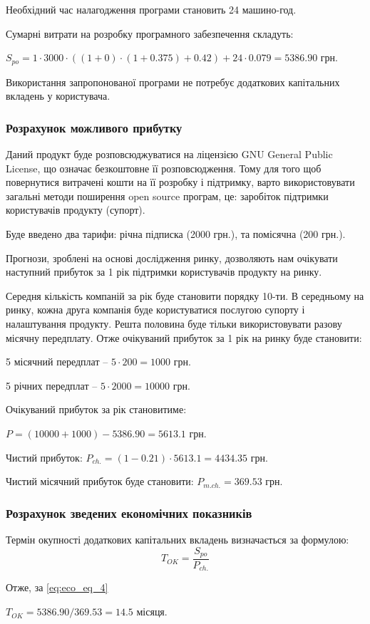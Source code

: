 \par Необхідний час налагодження програми становить 24 машино-год.
\par Сумарні витрати на розробку програмного забезпечення складуть:
	\par
\begin{center}
	$S_{po} = 1\cdot3000\cdot((1+0)\cdot(1+0.375)+0.42)+24\cdot0.079=5386.90$ грн.
\end{center}
\par Використання запропонованої програми не потребує додаткових капітальних вкладень у користувача.


\subsubsection{Розрахунок можливого прибутку}
\par Даний продукт буде розповсюджуватися на ліцензією GNU General Public License, що означає безкоштовне її розповсюдження. Тому для того щоб повернутися витрачені кошти на її розробку і підтримку, варто використовувати загальні методи поширення open source програм, це: заробіток підтримки користувачів продукту (супорт). 
\par Буде введено два тарифи: річна підписка (2000 грн.), та помісячна (200 грн.).
\par Прогнози, зроблені на основі дослідження ринку, дозволяють нам очікувати наступний прибуток за 1 рік підтримки користувачів продукту на ринку.
\par Середня кількість компаній за рік буде становити порядку 10-ти. В середньому на ринку, кожна друга компанія буде користуватися послугою супорту і налаштування продукту. Решта половина буде тільки використовувати разову місячну передплату. Отже очікуваний прибуток за 1 рік на ринку буде становити:
\par 5 місячний передплат -- $5\cdot200 = 1000$ грн.
\par 5 річних передплат -- $5\cdot2000 = 10000$ грн.
\par Очікуваний прибуток за рік становитиме: 
\par $P = (10000+1000)-5386.90 = 5613.1$ грн.
\par Чистий прибуток: $P_{ch.} = (1-0.21)\cdot5613.1=4434.35$ грн.
\par Чистий місячний прибуток буде становити: $P_{m.ch.}=369.53$ грн.


\subsubsection{Розрахунок зведених економічних показників}
\par Термін   окупності   додаткових   капітальних   вкладень   визначається   за формулою:
\begin{equation}\label{eq:eco_eq_4}
	T_{OK} = \frac{S_{po}}{P_{ch.}}
\end{equation}
\par Отже, за \eqref{eq:eco_eq_4}
\begin{center}
	$T_{OK}=5386.90/369.53=14.5$ місяця.
\end{center}

